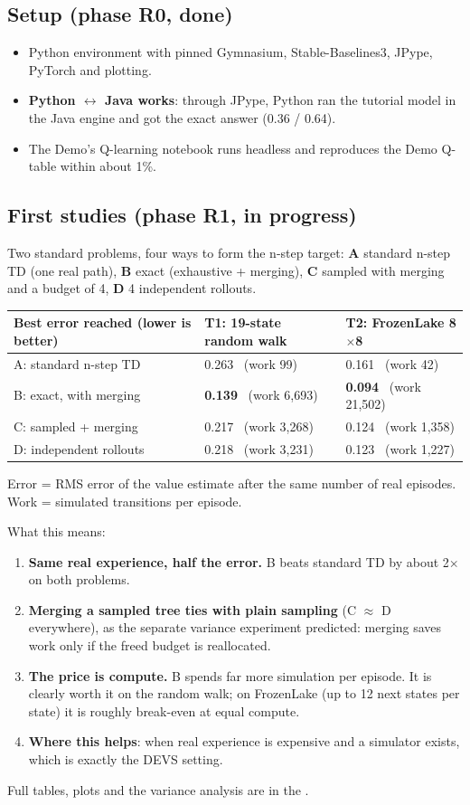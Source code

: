 \documentclass[11pt]{article}
\begin{document}
\subsection{Setup (phase R0, done)}
\begin{itemize}
\item Python environment  with pinned Gymnasium, Stable-Baselines3, JPype, PyTorch and plotting.
\item \textbf{Python $\leftrightarrow$ Java works}: through JPype, Python ran the tutorial model in the Java engine and
  got the exact answer (0.36 / 0.64).
\item The Demo's Q-learning notebook runs headless and reproduces the Demo Q-table within about 1\%.
\end{itemize}

\subsection{First studies (phase R1, in progress)}
Two standard problems, four ways to form the n-step target:
\textbf{A} standard n-step TD (one real path), \textbf{B} exact (exhaustive + merging),
\textbf{C} sampled with merging and a budget of 4, \textbf{D} 4 independent rollouts.

\begin{tabularx}{\linewidth}{@{}YYY@{}}
\toprule
\textbf{Best error reached (lower is better)} & \textbf{T1: 19-state random walk} & \textbf{T2: FrozenLake 8$\times$8}\\
\midrule
A: standard n-step TD & 0.263 \ (work 99) & 0.161 \ (work 42)\\
B: exact, with merging & \textbf{0.139} \ (work 6{,}693) & \textbf{0.094} \ (work 21{,}502)\\
C: sampled + merging & 0.217 \ (work 3{,}268) & 0.124 \ (work 1{,}358)\\
D: independent rollouts & 0.218 \ (work 3{,}231) & 0.123 \ (work 1{,}227)\\
\bottomrule
\end{tabularx}
\smallskip
{\small Error = RMS error of the value estimate after the same number of real episodes. Work = simulated transitions
per episode.}

What this means:
\begin{enumerate}
\item \textbf{Same real experience, half the error.} B beats standard TD by about 2$\times$ on both problems.
\item \textbf{Merging a sampled tree ties with plain sampling} (C $\approx$ D everywhere), as the separate variance
  experiment predicted: merging saves work only if the freed budget is reallocated.
\item \textbf{The price is compute.} B spends far more simulation per episode. It is clearly worth it on the random
  walk; on FrozenLake (up to 12 next states per state) it is roughly break-even at equal compute.
\item \textbf{Where this helps}: when real experience is expensive and a simulator exists, which is exactly the DEVS
  setting.
\end{enumerate}
Full tables, plots and the variance analysis are in the .
\end{document}
